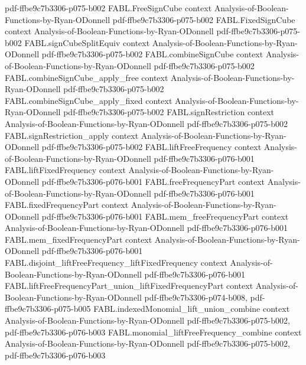 \begin{theorem}
  {pdf-ffbe9c7b3306-p075-b002}
\proofstep
  {FABL.FreeSignCube}
  {context}
  {Analysis-of-Boolean-Functions-by-Ryan-ODonnell}
  {pdf-ffbe9c7b3306-p075-b002}
\proofstep
  {FABL.FixedSignCube}
  {context}
  {Analysis-of-Boolean-Functions-by-Ryan-ODonnell}
  {pdf-ffbe9c7b3306-p075-b002}
\proofstep
  {FABL.signCubeSplitEquiv}
  {context}
  {Analysis-of-Boolean-Functions-by-Ryan-ODonnell}
  {pdf-ffbe9c7b3306-p075-b002}
\proofstep
  {FABL.combineSignCube}
  {context}
  {Analysis-of-Boolean-Functions-by-Ryan-ODonnell}
  {pdf-ffbe9c7b3306-p075-b002}
\proofstep
  {FABL.combineSignCube_apply_free}
  {context}
  {Analysis-of-Boolean-Functions-by-Ryan-ODonnell}
  {pdf-ffbe9c7b3306-p075-b002}
\proofstep
  {FABL.combineSignCube_apply_fixed}
  {context}
  {Analysis-of-Boolean-Functions-by-Ryan-ODonnell}
  {pdf-ffbe9c7b3306-p075-b002}
\proofstep
  {FABL.signRestriction}
  {context}
  {Analysis-of-Boolean-Functions-by-Ryan-ODonnell}
  {pdf-ffbe9c7b3306-p075-b002}
\proofstep
  {FABL.signRestriction_apply}
  {context}
  {Analysis-of-Boolean-Functions-by-Ryan-ODonnell}
  {pdf-ffbe9c7b3306-p075-b002}
\proofstep
  {FABL.liftFreeFrequency}
  {context}
  {Analysis-of-Boolean-Functions-by-Ryan-ODonnell}
  {pdf-ffbe9c7b3306-p076-b001}
\proofstep
  {FABL.liftFixedFrequency}
  {context}
  {Analysis-of-Boolean-Functions-by-Ryan-ODonnell}
  {pdf-ffbe9c7b3306-p076-b001}
\proofstep
  {FABL.freeFrequencyPart}
  {context}
  {Analysis-of-Boolean-Functions-by-Ryan-ODonnell}
  {pdf-ffbe9c7b3306-p076-b001}
\proofstep
  {FABL.fixedFrequencyPart}
  {context}
  {Analysis-of-Boolean-Functions-by-Ryan-ODonnell}
  {pdf-ffbe9c7b3306-p076-b001}
\proofstep
  {FABL.mem_freeFrequencyPart}
  {context}
  {Analysis-of-Boolean-Functions-by-Ryan-ODonnell}
  {pdf-ffbe9c7b3306-p076-b001}
\proofstep
  {FABL.mem_fixedFrequencyPart}
  {context}
  {Analysis-of-Boolean-Functions-by-Ryan-ODonnell}
  {pdf-ffbe9c7b3306-p076-b001}
\proofstep
  {FABL.disjoint_liftFreeFrequency_liftFixedFrequency}
  {context}
  {Analysis-of-Boolean-Functions-by-Ryan-ODonnell}
  {pdf-ffbe9c7b3306-p076-b001}
\proofstep
  {FABL.liftFreeFrequencyPart_union_liftFixedFrequencyPart}
  {context}
  {Analysis-of-Boolean-Functions-by-Ryan-ODonnell}
  {pdf-ffbe9c7b3306-p074-b008,
    pdf-ffbe9c7b3306-p075-b005}
\proofstep
  {FABL.indexedMonomial_lift_union_combine}
  {context}
  {Analysis-of-Boolean-Functions-by-Ryan-ODonnell}
  {pdf-ffbe9c7b3306-p075-b002,
    pdf-ffbe9c7b3306-p076-b003}
\proofstep
  {FABL.monomial_liftFreeFrequency_combine}
  {context}
  {Analysis-of-Boolean-Functions-by-Ryan-ODonnell}
  {pdf-ffbe9c7b3306-p075-b002,
    pdf-ffbe9c7b3306-p076-b003}

\end{theorem}
